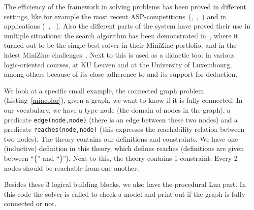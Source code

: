 \documentclass[runningheads]{llncs}
\newcommand{\logicname}[1]{\text{\sc #1}\xspace}
\newcommand{\idp}{\logicname{IDP}}
\newcommand{\minisatid}{\logicname{MiniSAT(ID)}}
\begin{document}
 The efficiency of the \idp framework in solving problems has been proved in different settings, like for example the most recent ASP-competitions~(\cite{ASP-Comp-2},~\cite{ASP-Comp-3},~\cite{conf/lpnmr/Alviano}) and in applications (~\cite{corr/Blockeel13}, ~\cite{iclp/VanHertum13}). Also the different parts of the system have proved their use in multiple situations: the search algorithm \minisatid has been demonstrated in~\cite{misc/amadini2013}, where it turned out to be the single-best solver in their MiniZinc portfolio, and in the latest MiniZinc challenges~\cite{url:MinizincChallenge2012}. Next to this \idp is used as a didactic tool in various logic-oriented courses, at KU Leuven and at the University of Luxembourg, among others because of its close adherence to \FO and its support for deduction.


We look at a specific small example, the connected graph problem (Listing~\ref{mincolor}), given a graph, we want to know if it is fully connected.
In our vocabulary, we have a type node (the domain of nodes in the graph), a predicate \texttt{edge(node,node)} (there is an edge between these two nodes) and a predicate \texttt{reaches(node,node)} (this expresses the reachability relation between two nodes).
The theory contains our definitions and constraints.
We have one (inductive) definition in this theory, which defines reaches (definitions are given between ``\{'' and ``\}'').
Next to this, the theory contains 1 constraint: Every 2 nodes should be reachable from one another.

Besides these 3 logical building blocks, we also have the procedural Lua part.
In this code the solver is called to check a model and print out if the graph is fully connected or not.
\end{document}
